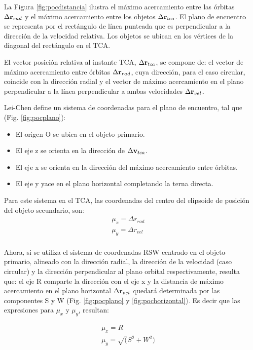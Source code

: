 La Figura \ref{fig:pocdistancia} ilustra el m\'aximo acercamiento entre las \'orbitas $\Delta {\bf{r}}_{rad}$ y el m\'aximo acercamiento entre los objetos $\Delta {\bf{r}}_{tca}$. El plano de encuentro se representa por el rect\'angulo de l\'inea punteada que es perpendicular a la direcci\'on de la velocidad relativa. Los objetos se ubican en los v\'ertices de la diagonal del rect\'angulo en el TCA.

El vector posici\'on relativa al instante TCA, $\Delta {\bf{r}}_{tca}$, se compone de: el vector de m\'aximo acercamiento entre \'orbitas $\Delta {\bf{r}}_{rad}$, cuya direcci\'on, para el caso circular, coincide con la direcci\'on radial y el vector de m\'aximo acercamiento en el plano perpendicular a la l\'inea perpendicular a ambas velocidades $\Delta {\bf{r}}_{vel}$.

Lei-Chen define un sistema de coordenadas para el plano de encuentro, tal que (Fig. \ref{fig:pocplano}):
\begin{itemize}
 \item El origen O se ubica en el objeto primario.
 \item El eje z se orienta en la direcci\'on de $\Delta {\bf{v}}_{tca}$.
 \item El eje x se orienta en la direcci\'on del m\'aximo acercamiento entre \'orbitas.
 \item El eje y yace en el plano horizontal completando la terna directa.
\end{itemize}

Para este sistema en el TCA, las coordenadas del centro del elipsoide de posici\'on del objeto secundario, son:\\
% 
\begin{gather}
 \mu_{x}=\Delta r_{rad}\\
 \mu_{y}=\Delta r_{vel}\\
\end{gather}

Ahora, si se utiliza el sistema de coordenadas RSW centrado en el objeto primario, alineado con la direcci\'on radial, la direcci\'on de la velocidad (caso circular) y la direcci\'on perpendicular al plano orbital respectivamente, resulta que: 
el eje R comparte la direcci\'on con el eje x y la distancia de m\'aximo acercamiento en el plano horizontal $\Delta {\bf{r}}_{vel}$ quedar\'a determinada por las componentes S y W (Fig. \ref{fig:pocplano} y \ref{fig:pochorizontal}).  Es decir que las expresiones para $\mu_{x}$ y $\mu_{y}$, resultan:

\begin{gather}
 \mu_{x}=R\\
 \mu_{y}=\sqrt(S^{2}+W^{2})
\end{gather}


